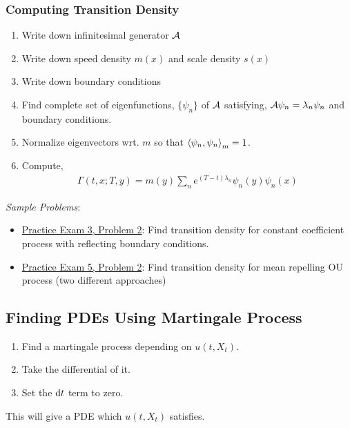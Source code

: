 \documentclass[12pt]{article}
\begin{document}
\subsubsection{Computing Transition Density}
\begin{enumerate}[nolistsep]
    \item Write down infinitesimal generator \( \mathcal{A} \)
    \item Write down speed density \( m(x) \) and scale density \( s(x) \)
    \item Write down boundary conditions
    \item Find complete set of eigenfunctions, \( \{ \psi_n \} \) of \( \mathcal{A} \) satisfying, \( \mathcal{A} \psi_n = \lambda_n\psi_n \) and boundary conditions.
    \item Normalize eigenvectors wrt. \( m \) so that \( \left\langle \psi_n,\psi_n \right\rangle_m = 1 \).
    \item Compute,
        \begin{align*}
            \Gamma(t,x;T,y) = m(y)\sum_{n} e^{(T-t)\lambda_n} \psi_n(y)\psi_n(x)
        \end{align*}
\end{enumerate}

\textit{Sample Problems}:
\begin{itemize}[nolistsep]
    \item \hyperref[Practice Exam 3, Problem 2]{Practice Exam 3, Problem 2}: Find transition density for constant coefficient process with reflecting boundary conditions.
    \item \hyperref[Practice Exam 5, Problem 2]{Practice Exam 5, Problem 2}: Find transition density for mean repelling OU process (two different approaches)
\end{itemize}



\subsection{Finding PDEs Using Martingale Process}
\begin{enumerate}[nolistsep]
    \item Find a martingale process depending on \( u(t,X_t) \).
    \item Take the differential of it.
    \item Set the \( \mathrm{d} t \) term to zero.
\end{enumerate}

This will give a PDE which \( u(t,X_t) \) satisfies.
\end{document}
